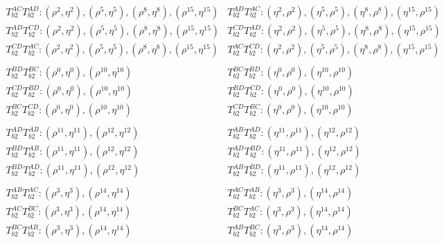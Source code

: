 \documentclass{article}
\begin{document}
\begin{equation}
    \begin{array}{ll}
    T^{AC}_{b2}T^{AD}_{b2}:(\rho^2, \eta^2), (\rho^5, \eta^5), (\rho^8, \eta^8), (\rho^{15}, \eta^{15}) &
    T^{AD}_{b2}T^{AC}_{b2}:(\eta^2, \rho^2), (\eta^5, \rho^5), (\eta^8, \rho^8), (\eta^{15}, \rho^{15})\\
    
    T^{AD}_{b2}T^{CD}_{b2}:(\rho^2, \eta^2), (\rho^5, \eta^5), (\rho^8, \eta^8), (\rho^{15}, \eta^{15}) &
    T^{CD}_{b2}T^{AD}_{b2}:(\eta^2, \rho^2), (\eta^5, \rho^5), (\eta^8, \rho^8), (\eta^{15}, \rho^{15})\\
    
    T^{CD}_{b2}T^{AC}_{b2}:(\rho^2, \eta^2), (\rho^5, \eta^5), (\rho^8, \eta^8), (\rho^{15}, \eta^{15}) &
    T^{AC}_{b2}T^{CD}_{b2}:(\eta^2, \rho^2), (\eta^5, \rho^5), (\eta^8, \rho^8), (\eta^{15}, \rho^{15})\\
    \\
    T^{BD}_{b2}T^{BC}_{b2}:(\rho^0, \eta^0), (\rho^{10}, \eta^{10}) & 
    T^{BC}_{b2}T^{BD}_{b2}:(\eta^0, \rho^0), (\eta^{10}, \rho^{10})\\ 

    T^{CD}_{b2}T^{BD}_{b2}:(\rho^0, \eta^0), (\rho^{10}, \eta^{10}) &
    T^{BD}_{b2}T^{CD}_{b2}:(\eta^0, \rho^0), (\eta^{10}, \rho^{10})\\

    T^{BC}_{b2}T^{CD}_{b2}:(\rho^0, \eta^0), (\rho^{10}, \eta^{10})&
    T^{CD}_{b2}T^{BC}_{b2}:(\eta^0, \rho^0), (\eta^{10}, \rho^{10})\\
    \\
    T^{AD}_{b2}T^{AB}_{b2}:(\rho^{11}, \eta^{11}), (\rho^{12}, \eta^{12}) &
    T^{AB}_{b2}T^{AD}_{b2}:(\eta^{11}, \rho^{11}), (\eta^{12}, \rho^{12})\\

    T^{BD}_{b2}T^{AB}_{b2}:(\rho^{11}, \eta^{11}), (\rho^{12}, \eta^{12}) &
    T^{AD}_{b2}T^{BD}_{b2}:(\eta^{11}, \rho^{11}), (\eta^{12}, \rho^{12})\\
    
    T^{BD}_{b2}T^{AD}_{b2}:(\rho^{11}, \eta^{11}), (\rho^{12}, \eta^{12}) &
    T^{AB}_{b2}T^{BD}_{b2}:(\eta^{11}, \rho^{11}), (\eta^{12}, \rho^{12})\\
    \\
    T^{AB}_{b2}T^{AC}_{b2}:(\rho^3, \eta^3), (\rho^{14}, \eta^{14}) &
    T^{AC}_{b2}T^{AB}_{b2}:(\eta^3, \rho^3), (\eta^{14}, \rho^{14})\\
    
    T^{AC}_{b2}T^{BC}_{b2}:(\rho^3, \eta^3), (\rho^{14}, \eta^{14}) &
    T^{BC}_{b2}T^{AC}_{b2}:(\eta^3, \rho^3), (\eta^{14}, \rho^{14})\\
    
    T^{BC}_{b2}T^{AB}_{b2}:(\rho^3, \eta^3), (\rho^{14}, \eta^{14}) &
    T^{AB}_{b2}T^{BC}_{b2}:(\eta^3, \rho^3), (\eta^{14}, \rho^{14})
    \end{array}
\end{equation}
\end{document}

